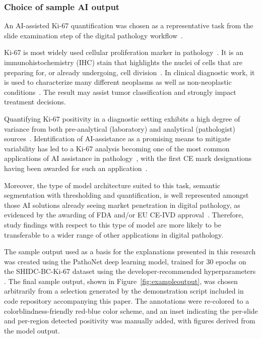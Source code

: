 \documentclass[final,5p,times,twocolumn,hyphens]{elsarticle}
\begin{document}
\subsubsection{Choice of sample AI output}

An AI-assisted Ki-67 quantification was chosen as a representative task from the slide examination step of the digital pathology workflow~\cite{Kargl-et-al:2020:PathoWorkflows}.

Ki-67 is most widely used cellular proliferation marker in pathology~\cite{li2015ki67}. It is an immunohistochemistry (IHC) stain that highlights the nuclei of cells that are preparing for, or already undergoing, cell division~\cite{scholzen2000ki}. In clinical diagnostic work, it is used to characterize many different neoplasms as well as non-neoplastic conditions~\cite{nadler2013ki}. The result may assist tumor classification and strongly impact treatment decisions. 

Quantifying Ki-67 positivity in a diagnostic setting exhibits a high degree of variance from both pre-analytical (laboratory) and analytical (pathologist) sources~\cite{polley2015international, rimm2019international}. Identification of AI-assistance as a promising means to mitigate variability has led to a Ki-67 analysis becoming one of the most common applications of AI assistance in pathology~\cite{geread2021pinet, lakshmi2020deep, govind2020improving}, with the first CE mark designations having been awarded for such an application~\cite{business-wire-2021}.  

Moreover, the type of model architecture suited to this task, semantic segmentation with thresholding and quantification, is well represented amongst those AI solutions already seeing market penetration in digital pathology, as evidenced by the awarding of FDA and/or EU CE-IVD approval~\cite{garcia2019new}. Therefore, study findings with respect to this type of model are more likely to be transferable to a wider range of other applications in digital pathology.

The sample output used as a basis for the explanations presented in this research was created using the PathoNet deep learning model, trained for 30 epochs on the SHIDC-BC-Ki-67 dataset using the developer-recommended hyperparameters \cite{negahbani2021pathonet}. The final sample output, shown in Figure~\ref{fig:exampleoutput}, was chosen arbitrarily from a selection generated by the demonstration script included in code repository accompanying this paper. The annotations were re-colored to a colorblindness-friendly red-blue color scheme, and an inset indicating the per-slide and per-region detected positivity was manually added, with figures derived from the model output.
\end{document}
